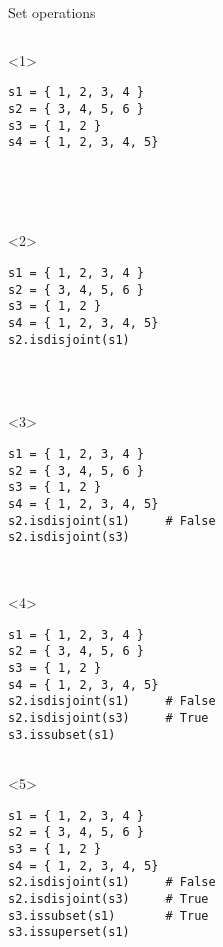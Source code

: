 \begin{frame}[fragile]{Set operations}

  \begin{columns}[onlytextwidth]
    \begin{column}{\textwidth}

      \begin{onlyenv}<1>
        \begin{lstlisting}[style=python,morekeywords={for, in, range, list}]
s1 = { 1, 2, 3, 4 }
s2 = { 3, 4, 5, 6 }
s3 = { 1, 2 }
s4 = { 1, 2, 3, 4, 5}





 \end{lstlisting}
      \end{onlyenv}

      \begin{onlyenv}<2>
        \begin{lstlisting}[style=python,morekeywords={for, in, range, list}]
s1 = { 1, 2, 3, 4 }
s2 = { 3, 4, 5, 6 }
s3 = { 1, 2 }
s4 = { 1, 2, 3, 4, 5}
s2.isdisjoint(s1)




 \end{lstlisting}
      \end{onlyenv}

      \begin{onlyenv}<3>
        \begin{lstlisting}[style=python,morekeywords={for, in, range, list}]
s1 = { 1, 2, 3, 4 }
s2 = { 3, 4, 5, 6 }
s3 = { 1, 2 }
s4 = { 1, 2, 3, 4, 5}
s2.isdisjoint(s1)     # False
s2.isdisjoint(s3)



 \end{lstlisting}
      \end{onlyenv}

      \begin{onlyenv}<4>
        \begin{lstlisting}[style=python,morekeywords={for, in, range, list}]
s1 = { 1, 2, 3, 4 }
s2 = { 3, 4, 5, 6 }
s3 = { 1, 2 }
s4 = { 1, 2, 3, 4, 5}
s2.isdisjoint(s1)     # False
s2.isdisjoint(s3)     # True
s3.issubset(s1)


 \end{lstlisting}
      \end{onlyenv}

      \begin{onlyenv}<5>
        \begin{lstlisting}[style=python,morekeywords={for, in, range, list}]
s1 = { 1, 2, 3, 4 }
s2 = { 3, 4, 5, 6 }
s3 = { 1, 2 }
s4 = { 1, 2, 3, 4, 5}
s2.isdisjoint(s1)     # False
s2.isdisjoint(s3)     # True
s3.issubset(s1)       # True
s3.issuperset(s1)


\end{lstlisting}
\end{onlyenv}
\end{column}
\end{columns}
\end{frame}
